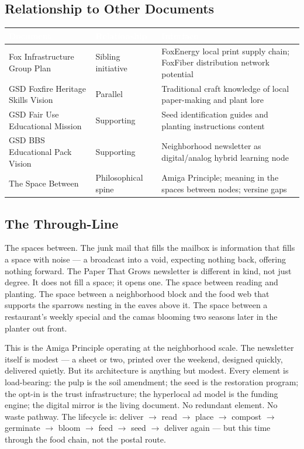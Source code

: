 \documentclass[11pt,letterpaper]{article}
\newcommand{\tableheader}[1]{\textbf{\sffamily\textcolor{white}{#1}}}
\begin{document}
\subsection{Relationship to Other Documents}

\begin{center}
\begin{tabularx}{\textwidth}{L{4cm}L{4cm}X}
\toprule
{}
\tableheader{Document} & \tableheader{Relationship} & \tableheader{Interface} \\
\midrule
Fox Infrastructure Group Plan & Sibling initiative & FoxEnergy local print supply chain; FoxFiber distribution network potential \\
GSD Foxfire Heritage Skills Vision & Parallel & Traditional craft knowledge of local paper-making and plant lore \\
GSD Fair Use Educational Mission & Supporting & Seed identification guides and planting instructions content \\
GSD BBS Educational Pack Vision & Supporting & Neighborhood newsletter as digital/analog hybrid learning node \\
The Space Between & Philosophical spine & Amiga Principle; meaning in the spaces between nodes; versine gaps \\
\bottomrule
\end{tabularx}
\end{center}

\subsection{The Through-Line}

The spaces between. The junk mail that fills the mailbox is information that fills a space with noise --- a broadcast into a void, expecting nothing back, offering nothing forward. The Paper That Grows newsletter is different in kind, not just degree. It does not fill a space; it opens one. The space between reading and planting. The space between a neighborhood block and the food web that supports the sparrows nesting in the eaves above it. The space between a restaurant's weekly special and the camas blooming two seasons later in the planter out front.

This is the Amiga Principle operating at the neighborhood scale. The newsletter itself is modest --- a sheet or two, printed over the weekend, designed quickly, delivered quietly. But its architecture is anything but modest. Every element is load-bearing: the pulp is the soil amendment; the seed is the restoration program; the opt-in is the trust infrastructure; the hyperlocal ad model is the funding engine; the digital mirror is the living document. No redundant element. No waste pathway. The lifecycle is: deliver $\rightarrow$ read $\rightarrow$ place $\rightarrow$ compost $\rightarrow$ germinate $\rightarrow$ bloom $\rightarrow$ feed $\rightarrow$ seed $\rightarrow$ deliver again --- but this time through the food chain, not the postal route.
\end{document}
